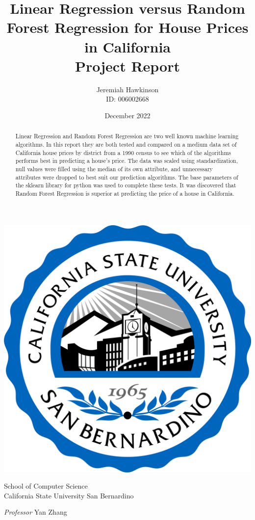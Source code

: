 \documentclass{article}
\title{Linear Regression versus Random Forest Regression for House Prices in California \\[1ex] \large Project Report}
\author{Jeremiah Hawkinson \\ ID: 006002668}
\date{December 2022}
\begin{document}
\maketitle

\begin{center}
    \includegraphics[scale=0.22]{Images/college logo.png}

    \vspace{0.8cm}

    School of Computer Science\\
    California State University San Bernardino\\

    \vspace{0.8cm}

    \textit{Professor} Yan Zhang

    \vspace{0.8cm}

\end{center}

\pagebreak

\begin{abstract}
Linear Regression and Random Forest Regression are two well known machine learning algorithms. In this report they are both tested and compared on a medium data set of California house prices by district from a 1990 census to see which of the algorithms performs best in predicting a house's price. The data was scaled using standardization, null values were filled using the median of its own attribute, and unnecessary attributes were dropped to best suit our prediction algorithms. The base parameters of the sklearn library for python was used to complete these tests. It was discovered that Random Forest Regression is superior at predicting the price of a house in California.
\end{abstract}
\end{document}
